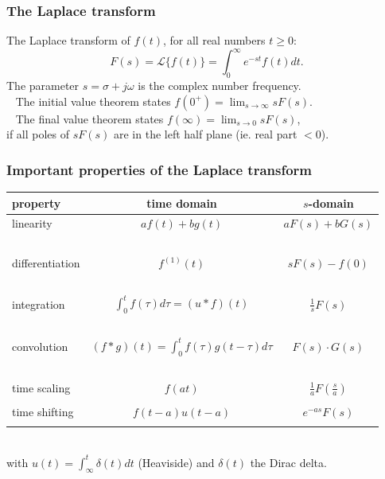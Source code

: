 \documentclass{beamer}
\begin{document}
\begin{frame}
\frametitle{The Laplace transform}
The Laplace transform of $f(t)$, for all real numbers $t\geq 0$:
\begin{equation*}
F(s) = \mathcal{L}\big\{f(t)\big\} = \int_0^\infty e^{-st} f(t) dt.
\end{equation*}
\pause
The parameter $s = \sigma + j\omega$ is the complex number frequency.\\ \pause
\ \newline
The initial value theorem states $f(0^+) = \lim_{s\rightarrow\infty} sF(s)$. \\
\pause
\ \newline
The final value theorem states $f(\infty) = \lim_{s\rightarrow0} sF(s)$, \\
if all poles of $sF(s)$ are in the left half plane (ie. real part $<0$).
\end{frame}

\begin{frame}
\frametitle{Important properties of the Laplace transform}
\centering
\begin{tabular}{lcc}
\textbf{property}	& \textbf{time domain}	& \textbf{$s$-domain} \\
\midrule
linearity	& $af(t)+bg(t)$ & $aF(s) + bG(s)$ \\ \pause
\ \\
differentiation	& $f^{(1)}(t)$	& $s F(s) - f(0)$ \\ \pause
\ \\
integration	& $\int_0^t f(\tau)d\tau = (u*f)(t)$	&	$\frac{1}{s}F(s)$ \\ \pause
\ \\
convolution	& $(f * g)(t)=\int_0^t f(\tau)g(t-\tau)d\tau$	& $F(s)\cdot G(s)$ \\ \pause
\ \\
time scaling	& $f(at)$	& $\frac{1}{a}F(\frac{s}{a})$ \\ \pause
\\
time shifting	& $f(t-a)u(t-a)$	& $e^{-as} F(s)$ \\ \pause
\end{tabular} \\
with $u(t)=\int_\infty^t \delta(t)dt$ (Heaviside) and $\delta(t)$ the Dirac delta.
\end{frame}
\end{document}
